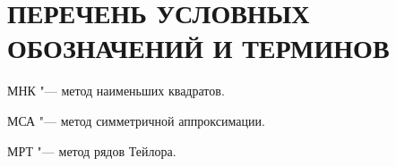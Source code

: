 \chapter*{ПЕРЕЧЕНЬ УСЛОВНЫХ ОБОЗНАЧЕНИЙ И ТЕРМИНОВ}

МНК "--- метод наименьших квадратов.

МСА "--- метод симметричной аппроксимации.

МРТ "--- метод рядов Тейлора.
